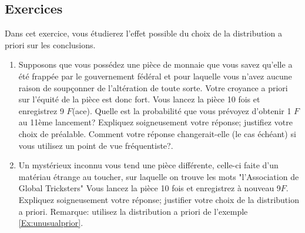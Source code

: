 \subsection*{Exercices} 
\begin{Exercice} \label{ex3.5.1} Dans cet exercice, vous étudierez l'effet possible du choix de la distribution a priori sur les conclusions.
\begin{enumerate}[noitemsep,label=(\alph*)]
	\item Supposons que vous possédez une pièce de monnaie que vous savez qu'elle a été frappée par le gouvernement fédéral et pour laquelle vous n'avez aucune raison de soupçonner de l'altération de toute sorte. Votre croyance a priori sur l'équité de la pièce est donc fort. Vous lancez la pièce 10 fois et
    enregistrez 9 $F$(ace). Quelle est la probabilité que vous prévoyez d'obtenir 1 $F$ au 11ème lancement? Expliquez soigneusement votre réponse; justifiez votre choix de préalable. Comment votre réponse changerait-elle (le cas échéant) si vous utilisez un point de vue fréquentiste?.
	\item Un mystérieux inconnu vous tend une pièce différente, celle-ci faite d'un matériau étrange au toucher, sur laquelle on trouve les mots "l'Association de Global Tricksters" Vous lancez la pièce 10 fois et enregistrez à nouveau 9$F$. Expliquez soigneusement votre réponse; justifier votre choix de la distribution a priori. Remarque: utilisez la distribution a priori de l'exemple \ref{Ex:unusualprior}.
\end{enumerate}
\end{Exercice}